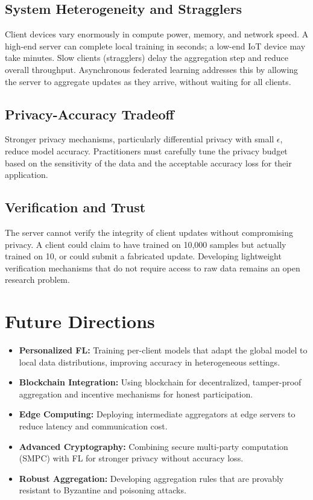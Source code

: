 \documentclass[conference]{IEEEtran}
\begin{document}
\subsection{System Heterogeneity and Stragglers}
Client devices vary enormously in compute power, memory, and network speed. A high-end server can complete local training in seconds; a low-end IoT device may take minutes. Slow clients (stragglers) delay the aggregation step and reduce overall throughput. Asynchronous federated learning addresses this by allowing the server to aggregate updates as they arrive, without waiting for all clients.

\subsection{Privacy-Accuracy Tradeoff}
Stronger privacy mechanisms, particularly differential privacy with small $\epsilon$, reduce model accuracy. Practitioners must carefully tune the privacy budget based on the sensitivity of the data and the acceptable accuracy loss for their application.

\subsection{Verification and Trust}
The server cannot verify the integrity of client updates without compromising privacy. A client could claim to have trained on 10,000 samples but actually trained on 10, or could submit a fabricated update. Developing lightweight verification mechanisms that do not require access to raw data remains an open research problem.

\section{Future Directions}

\begin{itemize}
    \item \textbf{Personalized FL:} Training per-client models that adapt the global model to local data distributions, improving accuracy in heterogeneous settings.
    \item \textbf{Blockchain Integration:} Using blockchain for decentralized, tamper-proof aggregation and incentive mechanisms for honest participation.
    \item \textbf{Edge Computing:} Deploying intermediate aggregators at edge servers to reduce latency and communication cost.
    \item \textbf{Advanced Cryptography:} Combining secure multi-party computation (SMPC) with FL for stronger privacy without accuracy loss.
    \item \textbf{Robust Aggregation:} Developing aggregation rules that are provably resistant to Byzantine and poisoning attacks.
\end{itemize}
\end{document}
